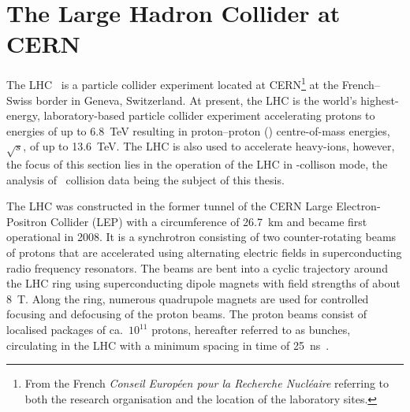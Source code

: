 \section{The Large Hadron Collider at CERN}%
\label{sec:lhc}

The LHC~\cite{Evans:2008zzb} is a particle collider experiment located at
CERN\footnote{From the French \emph{Conseil Européen pour la Recherche
    Nucléaire} referring to both the research organisation and the location of
  the laboratory sites.} at the French--Swiss border in Geneva, Switzerland.  At
present, the LHC is the world's highest-energy, laboratory-based particle
collider experiment accelerating protons to energies of up to \SI{6.8}{\TeV}
resulting in proton--proton (\pp) centre-of-mass energies, $\sqrt{s}$, of up to
\SI{13.6}{\TeV}. The LHC is also used to accelerate heavy-ions, however, the
focus of this section lies in the operation of the LHC in \pp-collison mode, the
analysis of \pp~collision data being the subject of this thesis.

The LHC was constructed in the former tunnel of the CERN Large Electron-Positron
Collider (LEP) with a circumference of \SI{26.7}{\kilo\metre} and became first
operational in 2008. It is a synchrotron consisting of two counter-rotating
beams of protons that are accelerated using alternating electric fields in
superconducting radio frequency resonators. The beams are bent into a cyclic
trajectory around the LHC ring using superconducting dipole magnets with field
strengths of about \SI{8}{\tesla}. Along the ring, numerous quadrupole magnets
are used for controlled focusing and defocusing of the proton beams.
The proton beams consist of localised packages of ca.\ $10^{11}$ protons,
hereafter referred to as bunches, circulating in the LHC with a minimum spacing
in time of \SI{25}{\nano\second}~\cite{Evans:2008zzb}.

